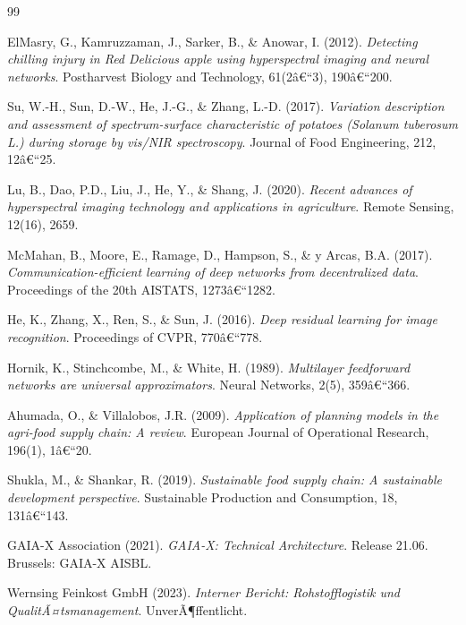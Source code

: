 ﻿\documentclass[12pt,a4paper]{article}
\theoremstyle{plain}
\theoremstyle{definition}
\begin{document}
	\begin{thebibliography}{99}
		
		ElMasry, G., Kamruzzaman, J., Sarker, B., \& Anowar, I. (2012).
		\textit{Detecting chilling injury in Red Delicious apple using
			hyperspectral imaging and neural networks}.
		Postharvest Biology and Technology, 61(2â€“3), 190â€“200.
		
		Su, W.-H., Sun, D.-W., He, J.-G., \& Zhang, L.-D. (2017).
		\textit{Variation description and assessment of spectrum-surface characteristic
			of potatoes (Solanum tuberosum L.) during storage by vis/NIR spectroscopy}.
		Journal of Food Engineering, 212, 12â€“25.
		
		Lu, B., Dao, P.D., Liu, J., He, Y., \& Shang, J. (2020).
		\textit{Recent advances of hyperspectral imaging technology and applications
			in agriculture}.
		Remote Sensing, 12(16), 2659.
		
		McMahan, B., Moore, E., Ramage, D., Hampson, S., \& y Arcas, B.A. (2017).
		\textit{Communication-efficient learning of deep networks from decentralized
			data}.
		Proceedings of the 20th AISTATS, 1273â€“1282.
		
		He, K., Zhang, X., Ren, S., \& Sun, J. (2016).
		\textit{Deep residual learning for image recognition}.
		Proceedings of CVPR, 770â€“778.
		
		Hornik, K., Stinchcombe, M., \& White, H. (1989).
		\textit{Multilayer feedforward networks are universal approximators}.
		Neural Networks, 2(5), 359â€“366.
		
		Ahumada, O., \& Villalobos, J.R. (2009).
		\textit{Application of planning models in the agri-food supply chain:
			A review}.
		European Journal of Operational Research, 196(1), 1â€“20.
		
		Shukla, M., \& Shankar, R. (2019).
		\textit{Sustainable food supply chain: A sustainable development perspective}.
		Sustainable Production and Consumption, 18, 131â€“143.
		
		GAIA-X Association (2021).
		\textit{GAIA-X: Technical Architecture}.
		Release 21.06. Brussels: GAIA-X AISBL.
		
		Wernsing Feinkost GmbH (2023).
		\textit{Interner Bericht: Rohstofflogistik und QualitÃ¤tsmanagement}.
		UnverÃ¶ffentlicht.
		
	\end{thebibliography}
	
\end{document}
